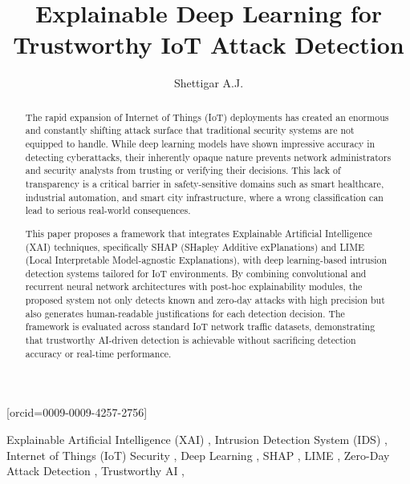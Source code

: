 \documentclass[a4paper,fleqn]{cas-dc}
\numberwithin{equation}{section}
\begin{document}
\let\WriteBookmarks\relax
\def\floatpagepagefraction{1}
\def\textpagefraction{.001}


\title[mode = title]{Explainable Deep Learning for Trustworthy IoT Attack Detection}

\author[1]{Shettigar A.J.}[orcid=0009-0009-4257-2756]
\address[1]{School of Computer Science and Engineering, VIT-AP University, Amaravati, Andhra Pradesh, India}


\begin{abstract}
The rapid expansion of Internet of Things (IoT) deployments has created an enormous and constantly shifting attack surface that traditional security systems are not equipped to handle. While deep learning models have shown impressive accuracy in detecting cyberattacks, their inherently opaque nature prevents network administrators and security analysts from trusting or verifying their decisions. This lack of transparency is a critical barrier in safety-sensitive domains such as smart healthcare, industrial automation, and smart city infrastructure, where a wrong classification can lead to serious real-world consequences.

This paper proposes a framework that integrates Explainable Artificial Intelligence (XAI) techniques, specifically SHAP (SHapley Additive exPlanations) and LIME (Local Interpretable Model-agnostic Explanations), with deep learning-based intrusion detection systems tailored for IoT environments. By combining convolutional and recurrent neural network architectures with post-hoc explainability modules, the proposed system not only detects known and zero-day attacks with high precision but also generates human-readable justifications for each detection decision. The framework is evaluated across standard IoT network traffic datasets, demonstrating that trustworthy AI-driven detection is achievable without sacrificing detection accuracy or real-time performance.
\end{abstract}

\begin{keywords}
Explainable Artificial Intelligence (XAI) \sep
Intrusion Detection System (IDS) \sep
Internet of Things (IoT) Security \sep
Deep Learning \sep
SHAP \sep
LIME \sep
Zero-Day Attack Detection \sep
Trustworthy AI \sep
\end{keywords}
\end{document}
